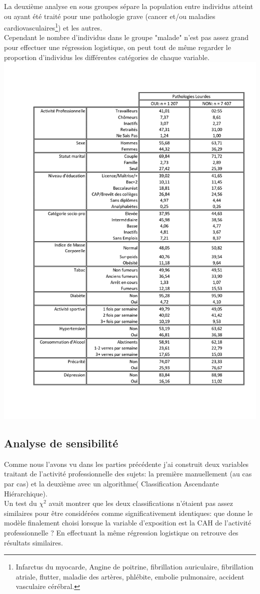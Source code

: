 \documentclass{book}
\begin{document}
\bigskip
\noindent
La deuxième analyse en sous groupes sépare la population entre individus atteint ou ayant été traité pour une pathologie grave (cancer et/ou maladies cardiovasculaires\footnote{Infarctus du myocarde, Angine de poitrine, fibrillation auriculaire, fibrillation atriale, flutter, maladie des artères, phlébite, embolie pulmonaire, accident vasculaire cérébral.}) et les autres.\\
Cependant le nombre d'individus dans le groupe "malade" n'est pas assez grand pour effectuer une régression logistique, on peut tout de même regarder le proportion d'individus les différentes catégories de chaque variable.\\
\includegraphics[scale=.3]{patho_lourdes.png}
\subsection{Analyse de sensibilité}
\noindent
Comme nous l'avons vu dans les parties précédente j'ai construit deux variables traitant de l'activité professionnelle des sujets: la première manuellement (au cas par cas) et la deuxième avec un algorithme( Classification Ascendante Hiérarchique).\\
Un test du $\chi ^2$ avait montrer que les deux classifications n'étaient pas assez similaires pour être considérées comme significativement identiques: que donne le modèle finalement choisi lorsque la variable d'exposition est la CAH de l'activité professionnelle ?
En effectuant la même régression logistique on retrouve des résultats similaires.\\
\end{document}
